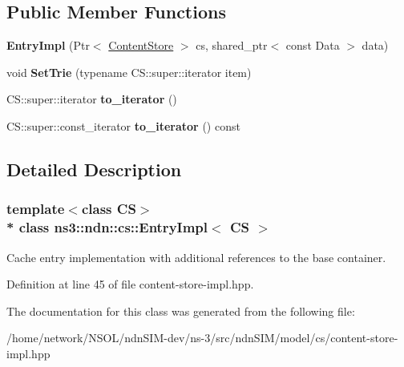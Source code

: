 \subsection*{Public Member Functions}
\begin{DoxyCompactItemize}
\item 
{\bfseries Entry\+Impl} (Ptr$<$ \hyperlink{classns3_1_1ndn_1_1ContentStore}{Content\+Store} $>$ cs, shared\+\_\+ptr$<$ const Data $>$ data)\hypertarget{classns3_1_1ndn_1_1cs_1_1EntryImpl_a8088868461080563943a0ba1374b0bfe}{}\label{classns3_1_1ndn_1_1cs_1_1EntryImpl_a8088868461080563943a0ba1374b0bfe}

\item 
void {\bfseries Set\+Trie} (typename C\+S\+::super\+::iterator item)\hypertarget{classns3_1_1ndn_1_1cs_1_1EntryImpl_add33637b419f406564b695d8beeff027}{}\label{classns3_1_1ndn_1_1cs_1_1EntryImpl_add33637b419f406564b695d8beeff027}

\item 
C\+S\+::super\+::iterator {\bfseries to\+\_\+iterator} ()\hypertarget{classns3_1_1ndn_1_1cs_1_1EntryImpl_add31c2f1666f8e6cc1693f28f37d1553}{}\label{classns3_1_1ndn_1_1cs_1_1EntryImpl_add31c2f1666f8e6cc1693f28f37d1553}

\item 
C\+S\+::super\+::const\+\_\+iterator {\bfseries to\+\_\+iterator} () const\hypertarget{classns3_1_1ndn_1_1cs_1_1EntryImpl_a3c2d47dd69256775ed133f5b5bf84ae9}{}\label{classns3_1_1ndn_1_1cs_1_1EntryImpl_a3c2d47dd69256775ed133f5b5bf84ae9}

\end{DoxyCompactItemize}


\subsection{Detailed Description}
\subsubsection*{template$<$class CS$>$\\*
class ns3\+::ndn\+::cs\+::\+Entry\+Impl$<$ C\+S $>$}

Cache entry implementation with additional references to the base container. 

Definition at line 45 of file content-\/store-\/impl.\+hpp.



The documentation for this class was generated from the following file\+:\begin{DoxyCompactItemize}
\item 
/home/network/\+N\+S\+O\+L/ndn\+S\+I\+M-\/dev/ns-\/3/src/ndn\+S\+I\+M/model/cs/content-\/store-\/impl.\+hpp\end{DoxyCompactItemize}
